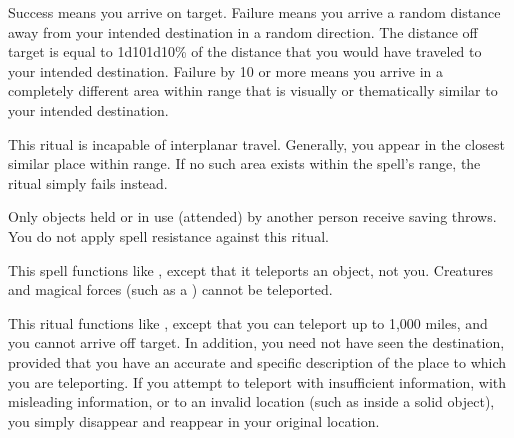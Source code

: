 \begin{spelleffect}
Success means you arrive on target. Failure means you arrive a random distance away from your intended destination in a random direction. The distance off target is equal to 1d10\mult1d10\% of the distance that you would have traveled to your intended destination. Failure by 10 or more means you arrive in a completely different area within range that is visually or thematically similar to your intended destination.
\end{spelleffect}
\begin{spellnotes}
This ritual is incapable of interplanar travel. Generally, you appear in the closest similar place within range. If no such area exists within the spell's range, the ritual simply fails instead.

Only objects held or in use (attended) by another person receive saving throws. You do not apply spell resistance against this ritual. 
\end{spellnotes}

\begin{spelleffect}
This spell functions like , except that it teleports an object, not you. Creatures and magical forces (such as a ) cannot be teleported.
\end{spelleffect}

\begin{spelleffect}
This ritual functions like , except that you can teleport up to 1,000 miles, and you cannot arrive off target. In addition, you need not have seen the destination, provided that you have an accurate and specific description of the place to which you are teleporting. If you attempt to teleport with insufficient information, with misleading information, or to an invalid location (such as inside a solid object), you simply disappear and reappear in your original location.
\end{spelleffect}

